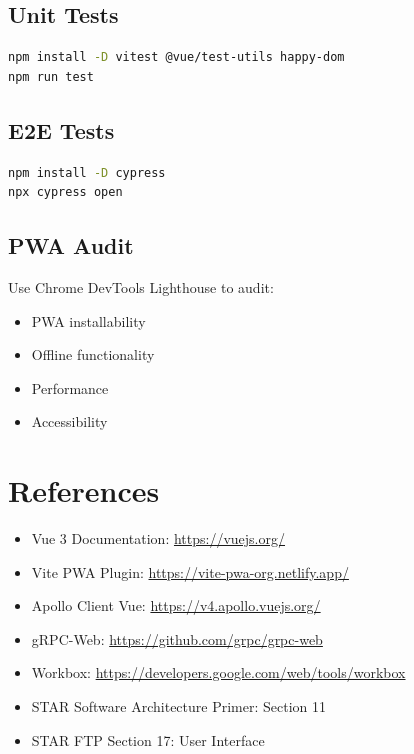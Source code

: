 \documentclass[11pt,letterpaper]{article}
\begin{document}
\subsection{Unit Tests}

\begin{lstlisting}[language=bash]
npm install -D vitest @vue/test-utils happy-dom
npm run test
\end{lstlisting}

\subsection{E2E Tests}

\begin{lstlisting}[language=bash]
npm install -D cypress
npx cypress open
\end{lstlisting}

\subsection{PWA Audit}

Use Chrome DevTools Lighthouse to audit:
\begin{itemize}
    \item PWA installability
    \item Offline functionality
    \item Performance
    \item Accessibility
\end{itemize}

\section{References}

\begin{itemize}
    \item Vue 3 Documentation: \url{https://vuejs.org/}
    \item Vite PWA Plugin: \url{https://vite-pwa-org.netlify.app/}
    \item Apollo Client Vue: \url{https://v4.apollo.vuejs.org/}
    \item gRPC-Web: \url{https://github.com/grpc/grpc-web}
    \item Workbox: \url{https://developers.google.com/web/tools/workbox}
    \item STAR Software Architecture Primer: Section 11
    \item STAR FTP Section 17: User Interface
\end{itemize}
\end{document}
